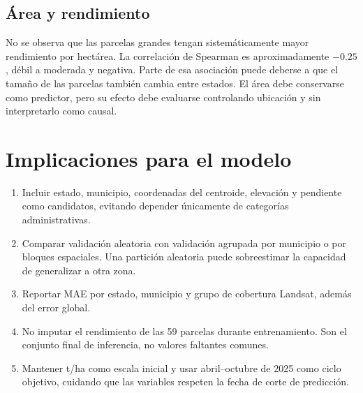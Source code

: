 \documentclass[11pt,a4paper]{article}
\begin{document}
\subsection{Área y rendimiento}
No se observa que las parcelas grandes tengan sistemáticamente mayor rendimiento
por hectárea. La correlación de Spearman es aproximadamente $-0.25$, débil a
moderada y negativa. Parte de esa asociación puede deberse a que el tamaño de las
parcelas también cambia entre estados. El área debe conservarse como predictor,
pero su efecto debe evaluarse controlando ubicación y sin interpretarlo como
causal.

\section{Implicaciones para el modelo}
\begin{enumerate}
  \item Incluir estado, municipio, coordenadas del centroide, elevación y pendiente
  como candidatos, evitando depender únicamente de categorías administrativas.
  \item Comparar validación aleatoria con validación agrupada por municipio o por
  bloques espaciales. Una partición aleatoria puede sobreestimar la capacidad de
  generalizar a otra zona.
  \item Reportar MAE por estado, municipio y grupo de cobertura Landsat, además
  del error global.
  \item No imputar el rendimiento de las 59 parcelas durante entrenamiento. Son
  el conjunto final de inferencia, no valores faltantes comunes.
  \item Mantener t/ha como escala inicial y usar abril--octubre de 2025 como ciclo
  objetivo, cuidando que las variables respeten la fecha de corte de predicción.
\end{enumerate}
\end{document}
